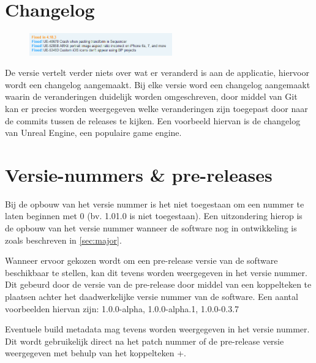 \section{Changelog}
\begin{figure}
	\includegraphics[width=0.55\textwidth]{images/Changelog.png}	
\end{figure}
De versie vertelt verder niets over wat er veranderd is aan de applicatie, hiervoor wordt een changelog aangemaakt.
Bij elke versie word een changelog aangemaakt waarin de veranderingen duidelijk worden omgeschreven, door middel van Git kan er precies worden weergegeven welke veranderingen zijn toegepast door naar de commits tussen de releases te kijken.
Een voorbeeld hiervan is de changelog van Unreal Engine, een populaire game engine.

\section{Versie-nummers \& pre-releases}
Bij de opbouw van het versie nummer is het niet toegestaan om een nummer te laten beginnen met 0 (bv. 1.01.0 is niet toegestaan). Een uitzondering hierop is de opbouw van het versie nummer wanneer de software nog in ontwikkeling is zoals beschreven in \cref{sec:major}.

Wanneer ervoor gekozen wordt om een pre-release versie van de software beschikbaar te stellen, kan dit tevens worden weergegeven in het versie nummer. Dit gebeurd door de versie van de pre-release door middel van een koppelteken te plaatsen achter het daadwerkelijke versie nummer van de software. Een aantal voorbeelden hiervan zijn: 1.0.0-alpha, 1.0.0-alpha.1, 1.0.0-0.3.7

Eventuele build metadata mag tevens worden weergegeven in het versie nummer. Dit wordt gebruikelijk direct na het patch nummer of de pre-release versie weergegeven met behulp van het koppelteken +.